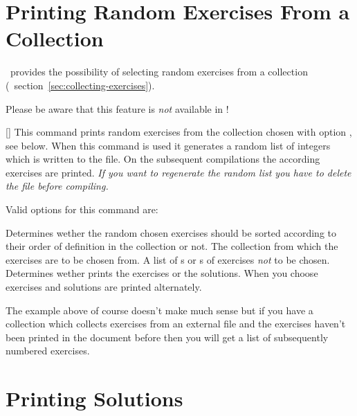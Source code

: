 \documentclass{xsim-manual}
\begin{document}
\section{Printing Random Exercises From a Collection}
\xsim\ provides the possibility of selecting random exercises from a
collection (\cf~section~\vref{sec:collecting-exercises}).
\begin{bewareofthedog}
  Please be aware that this feature is \emph{not} available in \XeLaTeX!
\end{bewareofthedog}
\begin{commands}
  []
    This command prints  random exercises from the collection
    chosen with option , see below.  When this command is
    used it generates a random list of integers which is written to the
     file.  On the subsequent compilations the according exercises
    are printed.  \emph{If you want to regenerate the random list you have to
      delete the  file before compiling.}
\end{commands}
Valid options for this command are:
\begin{options}
    Determines wether the random chosen exercises should be sorted according
    to their order of definition in the collection or not.
    The collection from which the exercises are to be chosen from.
    A list of s or s of exercises \emph{not} to be
    chosen.
    Determines wether  prints the exercises or the
    solutions.  When you choose  exercises and solutions are
    printed alternately.
\end{options}

\begin{example}
\end{example}

The example above of course doesn't make much sense but if you have a
collection which collects exercises from an external file and the exercises
haven't been printed in the document before then you will get a list of
subsequently numbered exercises.

\section{Printing Solutions}\label{sec:printing-solutions}
\end{document}
